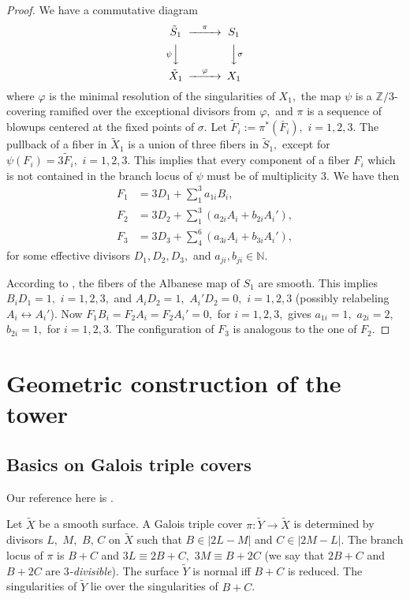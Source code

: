 \documentclass[10pt,a4paper]{article}
\newcommand{\ZZ}{\mathbb{Z}}
\begin{document}
\begin{proof}
We have a commutative diagram
\[
\begin{CD}
\tilde S_1     @>\pi>>  S_1\\
@V\psi VV        @VV\sigma V\\
\tilde X_1     @>\varphi>>  X_1
\end{CD}
\]
where $\varphi$ is the minimal resolution of the singularities of $X_1,$ the map $\psi$ is a
$\ZZ/3$-covering ramified over the exceptional divisors from $\varphi,$ and
$\pi$ is a sequence of blowups centered at the fixed points of $\sigma.$
Let $\tilde F_i:=\pi^*(\bar F_i),$ $i=1,2,3.$ The pullback of a fiber in $\tilde X_1$ is a union of three fibers
in $\tilde S_1,$ except for $\psi(F_i)=3\tilde F_i,$ $i=1,2,3.$ This implies that every component of a fiber $F_i$ which
is not contained in the branch locus of $\psi$ must be of multiplicity $3.$
We have then
\begin{align*}
F_1&=3D_1+\textstyle\sum_1^3 a_{1i}B_i,\\
F_2&=3D_2+\textstyle\sum_1^3(a_{2i}A_i+b_{2i}A_i'),\\
F_3&=3D_3+\textstyle\sum_4^6(a_{3i}A_i+b_{3i}A_i'),
\end{align*}
for some effective divisors $D_1,D_2,D_3,$ and $a_{ji},b_{ji}\in\mathbb N.$

According to \cite[Section~5]{R}, the fibers of the Albanese map of $S_1$ are smooth.
This implies $B_iD_1=1,$ $i=1,2,3,$ and $A_iD_2=1,$ $A_i'D_2=0,$ $i=1,2,3$ (possibly relabeling $A_i\leftrightarrow A_i'$).
Now $F_1B_i=F_2A_i=F_2A_i'=0,$ for $i=1,2,3,$ gives $a_{1i}=1,$ $a_{2i}=2,$ $b_{2i}=1,$ for $i=1,2,3.$
The configuration of $F_3$ is analogous to the one of $F_2.$

\end{proof}


\section{Geometric construction of the tower}\label{sec:Geometrie}

\subsection{Basics on Galois triple covers}
Our reference here is \cite{Tan1}.

Let $\tilde X$ be a smooth surface. A Galois triple cover $\pi:\tilde Y\rightarrow \tilde X$ is determined by
divisors $L,$ $M,$ $B$, $C$ on $\tilde X$ such that $B\in |2L-M|$ and $C\in |2M-L|$.
The branch locus of $\pi$ is $B+C$ and $3L\equiv 2B+C,$ $3M\equiv B+2C$
(we say that $2B+C$ and $B+2C$ are {\em $3$-divisible}). The surface $\tilde Y$
is normal iff $B+C$ is reduced. The singularities of $\tilde Y$ lie over the singularities of $B+C$.
\end{document}
